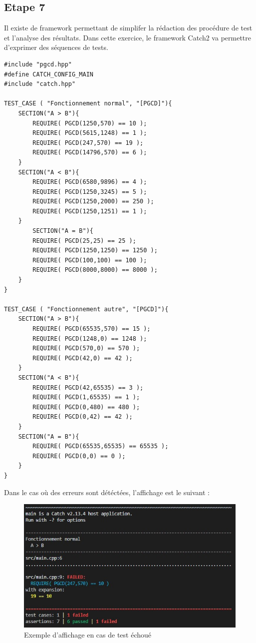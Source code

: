 \documentclass[a4paper]{article}
\begin{document}
    \subsection{Etape 7}
        Il existe de framework permettant de simplifer la rédaction des procédure de test et l'analyse des résultats.
        Dans cette exercice, le framework Catch2 va permettre d'exprimer des séquences de tests.
\begin{lstlisting}[style=CStyle]
#include "pgcd.hpp"
#define CATCH_CONFIG_MAIN
#include "catch.hpp"

TEST_CASE ( "Fonctionnement normal", "[PGCD]"){
    SECTION("A > B"){
        REQUIRE( PGCD(1250,570) == 10 );
        REQUIRE( PGCD(5615,1248) == 1 );
        REQUIRE( PGCD(247,570) == 19 );
        REQUIRE( PGCD(14796,570) == 6 );
    }
    SECTION("A < B"){
        REQUIRE( PGCD(6580,9896) == 4 );
        REQUIRE( PGCD(1250,3245) == 5 );
        REQUIRE( PGCD(1250,2000) == 250 );
        REQUIRE( PGCD(1250,1251) == 1 );
    }
        SECTION("A = B"){
        REQUIRE( PGCD(25,25) == 25 );
        REQUIRE( PGCD(1250,1250) == 1250 );
        REQUIRE( PGCD(100,100) == 100 );
        REQUIRE( PGCD(8000,8000) == 8000 );
    }
}

TEST_CASE ( "Fonctionnement autre", "[PGCD]"){
    SECTION("A > B"){
        REQUIRE( PGCD(65535,570) == 15 );
        REQUIRE( PGCD(1248,0) == 1248 );
        REQUIRE( PGCD(570,0) == 570 );
        REQUIRE( PGCD(42,0) == 42 );
    }
    SECTION("A < B"){
        REQUIRE( PGCD(42,65535) == 3 );
        REQUIRE( PGCD(1,65535) == 1 );
        REQUIRE( PGCD(0,480) == 480 );
        REQUIRE( PGCD(0,42) == 42 );
    }
    SECTION("A = B"){
        REQUIRE( PGCD(65535,65535) == 65535 );
        REQUIRE( PGCD(0,0) == 0 );
    }
}    
\end{lstlisting}        
        Dans le cas où des erreurs sont détéctées, l'affichage est le suivant :
        \begin{figure}
            \centering
            \includegraphics[width=15cm]{Pictures/test_failed.jpg}
            \caption{Exemple d'affichage en cas de test échoué}
            \label{fig:Test_failed}
        \end{figure}
\end{document}

